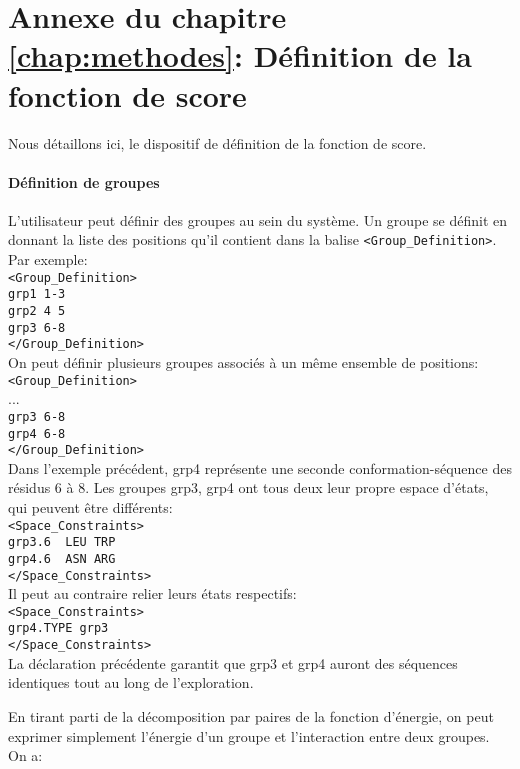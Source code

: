 \chapter*{Annexe du chapitre \ref{chap:methodes}: Définition de la fonction de score }
\label{annexe:score}
Nous détaillons ici, le dispositif de définition de la fonction de score. 

\subsubsection{Définition de groupes}
\label{sub:group}
L'utilisateur peut définir des groupes au sein du système. Un groupe se définit en donnant la liste des positions qu'il contient dans la balise \verb!<Group_Definition>!. Par exemple:\\
\verb!<Group_Definition>! \\
\verb!grp1 1-3! \\
\verb!grp2 4 5! \\
\verb!grp3 6-8! \\
\verb!</Group_Definition>! \\
On peut définir plusieurs groupes associés à un même ensemble de positions:\\
\verb!<Group_Definition>! \\
... \\
\verb!grp3 6-8! \\
\verb!grp4 6-8! \\
\verb!</Group_Definition>! \\
Dans l'exemple précédent, grp4 représente une seconde conformation-séquence des résidus 6 à 8. Les groupes grp3, grp4 ont tous deux leur propre espace d'états, qui peuvent être différents:\\
\verb!<Space_Constraints>! \\
\verb!grp3.6  LEU TRP! \\
\verb!grp4.6  ASN ARG!  \\
\verb!</Space_Constraints>! \\
Il peut au contraire relier leurs états respectifs:\\
\verb!<Space_Constraints>! \\
\verb!grp4.TYPE grp3! \\
\verb!</Space_Constraints>! \\
La déclaration précédente garantit que grp3 et grp4 auront des séquences identiques tout au long de l'exploration.

En tirant parti de la décomposition par paires de la fonction d'énergie, on peut exprimer simplement l'énergie d'un groupe et l'interaction entre deux groupes. On a:

